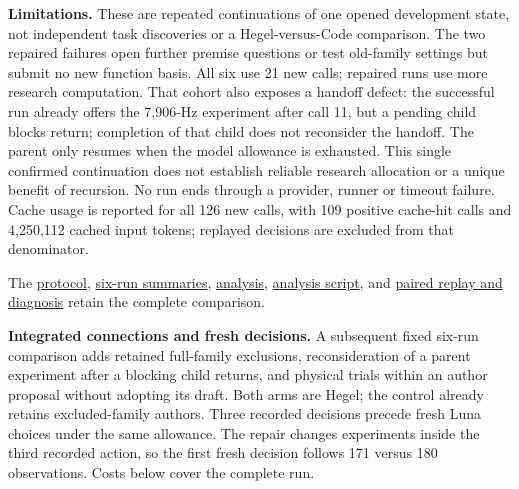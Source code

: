 \documentclass[twoside,11pt]{article}
\begin{document}
\textbf{Limitations.} These are repeated continuations of one opened development state, not independent task discoveries or a Hegel-versus-Code comparison. The two repaired failures open further premise questions or test old-family settings but submit no new function basis. All six use 21 new calls; repaired runs use more research computation. That cohort also exposes a handoff defect: the successful run already offers the 7,906-Hz experiment after call 11, but a pending child blocks return; completion of that child does not reconsider the handoff. The parent only resumes when the model allowance is exhausted. This single confirmed continuation does not establish reliable research allocation or a unique benefit of recursion. No run ends through a provider, runner or timeout failure. Cache usage is reported for all 126 new calls, with 109 positive cache-hit calls and 4,250,112 cached input tokens; replayed decisions are excluded from that denominator.


The \hyperlink{artifact-119}{protocol}, \hyperlink{artifact-120}{six-run summaries}, \hyperlink{artifact-121}{analysis}, \hyperlink{artifact-122}{analysis script}, and \hyperlink{artifact-123}{paired replay and diagnosis} retain the complete comparison.


\textbf{Integrated connections and fresh decisions.} A subsequent fixed six-run comparison adds retained full-family exclusions, reconsideration of a parent experiment after a blocking child returns, and physical trials within an author proposal without adopting its draft. Both arms are Hegel; the control already retains excluded-family authors. Three recorded decisions precede fresh Luna choices under the same allowance. The repair changes experiments inside the third recorded action, so the first fresh decision follows 171 versus 180 observations. Costs below cover the complete run.
\end{document}
